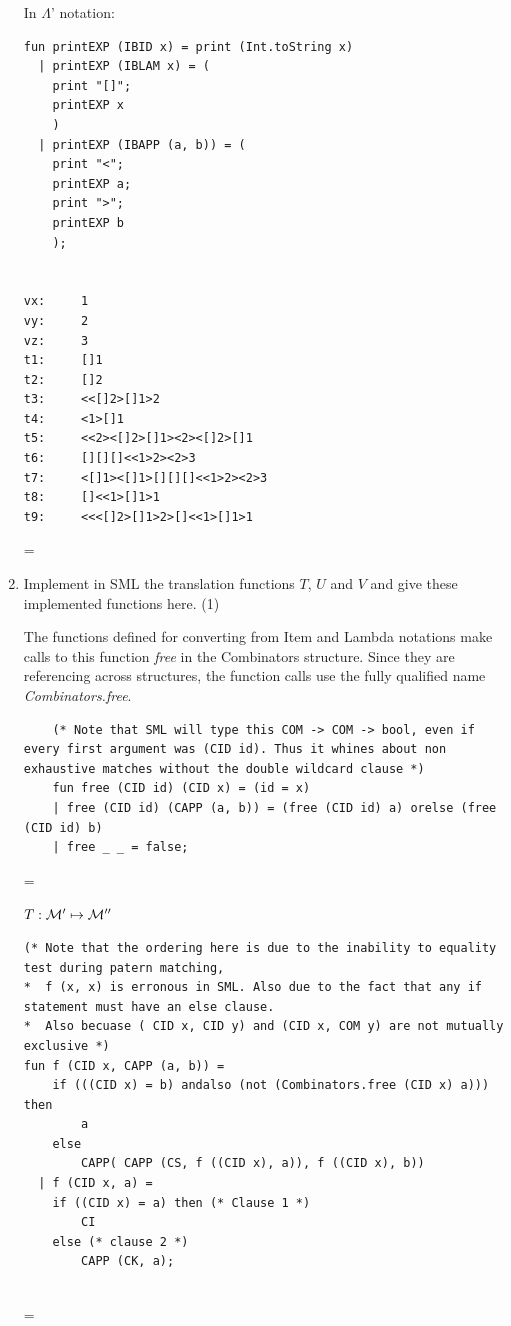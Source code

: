 \documentclass[11pt]{article}
\newenvironment{neverbreak} %
{\par\nobreak\vfil\penalty0\vfilneg
	\vtop\bgroup}
{\par\xdef\tpd{\the\prevdepth}\egroup
	\prevdepth=\tpd}
\begin{document}
\begin{enumerate}
\vspace{1cm}
\begin{neverbreak}
	In $\Lambda$' notation:
	\begin{verbatim}
fun printEXP (IBID x) = print (Int.toString x)
  | printEXP (IBLAM x) = (
	print "[]";
	printEXP x
	)
  | printEXP (IBAPP (a, b)) = (
	print "<";
	printEXP a;
	print ">";
	printEXP b
	);


vx:     1
vy:     2
vz:     3
t1:     []1
t2:     []2
t3:     <<[]2>[]1>2
t4:     <1>[]1
t5:     <<2><[]2>[]1><2><[]2>[]1
t6:     [][][]<<1>2><2>3
t7:     <[]1><[]1>[][][]<<1>2><2>3
t8:     []<<1>[]1>1
t9:     <<<[]2>[]1>2>[]<<1>[]1>1
	\end{verbatim}
\end{neverbreak}

\pagebreak
\item
Implement in SML the translation functions $T$, $U$ and $V$ and give these implemented functions here.
\hfill{(1)}\\ %

\begin{neverbreak}
	The functions defined for converting from Item and Lambda notations make calls to this function \textit{free} in the Combinators structure. Since they are referencing across structures, the function calls use the fully qualified name \textit{Combinators.free}.
	\begin{verbatim}
	(* Note that SML will type this COM -> COM -> bool, even if every first argument was (CID id). Thus it whines about non exhaustive matches without the double wildcard clause *)
	fun free (CID id) (CID x) = (id = x)
	| free (CID id) (CAPP (a, b)) = (free (CID id) a) orelse (free (CID id) b) 
	| free _ _ = false;
	\end{verbatim}
\end{neverbreak}

\begin{neverbreak}
	$T:{\cal M}'\mapsto {\cal M}''$\\
	\begin{verbatim}
(* Note that the ordering here is due to the inability to equality test during patern matching, 
*  f (x, x) is erronous in SML. Also due to the fact that any if statement must have an else clause. 
*  Also becuase ( CID x, CID y) and (CID x, COM y) are not mutually exclusive *)
fun f (CID x, CAPP (a, b)) = 
	if (((CID x) = b) andalso (not (Combinators.free (CID x) a))) then
		a
	else
		CAPP( CAPP (CS, f ((CID x), a)), f ((CID x), b))
  | f (CID x, a) =
	if ((CID x) = a) then (* Clause 1 *)
		CI 
	else (* clause 2 *)
		CAPP (CK, a);


\end{verbatim}
\end{neverbreak}
\end{enumerate}
\end{document}
